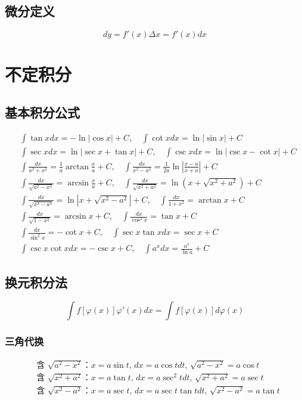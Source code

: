\documentclass{article}
\begin{document}
\subsection{微分定义}
\[
dy = f'(x)\Delta x = f'(x)dx
\]

\section{不定积分}
\subsection{基本积分公式}
\[
\begin{aligned}
&\int \tan x dx = -\ln|\cos x| + C, \quad \int \cot x dx = \ln|\sin x| + C \\
&\int \sec x dx = \ln|\sec x + \tan x| + C, \quad \int \csc x dx = \ln|\csc x - \cot x| + C \\
&\int \frac{dx}{a^2+x^2} = \frac{1}{a}\arctan\frac{x}{a} + C, \quad \int \frac{dx}{x^2-a^2} = \frac{1}{2a}\ln\left|\frac{x-a}{x+a}\right| + C \\
&\int \frac{dx}{\sqrt{a^2-x^2}} = \arcsin\frac{x}{a} + C, \quad \int \frac{dx}{\sqrt{x^2+a^2}} = \ln(x+\sqrt{x^2+a^2}) + C \\
&\int \frac{dx}{\sqrt{x^2-a^2}} = \ln|x+\sqrt{x^2-a^2}| + C, \quad \int \frac{dx}{1+x^2} = \arctan x + C \\
&\int \frac{dx}{\sqrt{1-x^2}} = \arcsin x + C, \quad \int \frac{dx}{\cos^2x} = \tan x + C \\
&\int \frac{dx}{\sin^2x} = -\cot x + C, \quad \int \sec x\tan x dx = \sec x + C \\
&\int \csc x\cot x dx = -\csc x + C, \quad \int a^x dx = \frac{a^x}{\ln a} + C
\end{aligned}
\]

\subsection{换元积分法}
\[
\int f[\varphi(x)]\varphi'(x)dx = \int f[\varphi(x)]d\varphi(x)
\]
\subsubsection{三角代换}
\[
\begin{aligned}
&\text{含 } \sqrt{a^2-x^2} \text{：} x = a\sin t, \, dx = a\cos t dt, \, \sqrt{a^2-x^2} = a\cos t \\
&\text{含 } \sqrt{x^2+a^2} \text{：} x = a\tan t, \, dx = a\sec^2t dt, \, \sqrt{x^2+a^2} = a\sec t \\
&\text{含 } \sqrt{x^2-a^2} \text{：} x = a\sec t, \, dx = a\sec t\tan t dt, \, \sqrt{x^2-a^2} = a\tan t
\end{aligned}
\]
\end{document}
